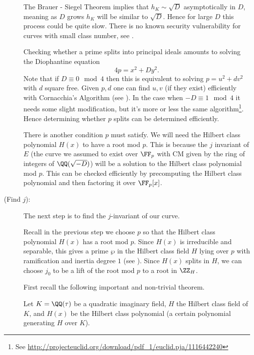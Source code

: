 \documentclass[11pt]{article}
\begin{document}
\begin{description}
	\begin{rem}
		The Brauer - Siegel Theorem implies that $h_K \sim \sqrt{D}$ asymptotically in $D$, meaning as $D$ grows $h_K$ will be similar to $\sqrt{D}$. Hence for large $D$ this process could be quite slow. There is no known security vulnerability for curves with small class number, see \cite[Ch.~4.2.3, Pg.~179]{hankerson2004guide}.
	\end{rem}

	Checking whether a prime splits into principal ideals amounts to solving the Diophantine equation
	$$
	4p = x^2 + Dy^2.
	$$
	Note that if $D\equiv 0\mod{4}$ then this is equivalent to solving $p = u^2 + dv^2$ with $d$ square free. Given $p,d$ one can find $u,v$ (if they exist) efficiently with Cornacchia's Algorithm (see \cite[Alg.~VIII.1]{blake1999elliptic}). In the case when $-D\equiv 1\mod{4}$ it needs some slight modification, but it's more or less the same algorithm\footnote{See \url{http://projecteuclid.org/download/pdf_1/euclid.pja/1116442240}}. Hence determining whether $p$ splits can be determined efficiently.
	
	There is another condition $p$ must satisfy. We will need the Hilbert class polynomial $H(x)$ to have a root mod $p$. This is because the $j$ invariant of $E$ (the curve we assumed to exist over $\FF_p$ with CM given by the ring of integers of $\QQ(\sqrt{-D})$) will be a solution to the Hilbert class polynomial mod $p$. This can be checked efficiently by precomputing the Hilbert class polynomial and then factoring it over $\FF_p[x]$.
	
	\item[(Find $j$):]
	
	The next step is to find the $j$-invariant of our curve.
	
	Recall in the previous step we choose $p$ so that the Hilbert class polynomial $H(x)$ has a root mod $p$. Since $H(x)$ is irreducible and separable, this gives a prime $\wp$ in the Hilbert class field $H$ lying over $p$ with ramification and inertia degree $1$ (see \cite[Prop.~I.8.3]{neukirch2013algebraic}). Since $H(x)$ splits in $H$, we can choose $j_0$ to be a lift of the root mod $p$ to a root in $\ZZ_H$.
	
	First recall the following important and non-trivial theorem.
	\begin{thm}
		Let $K=\QQ(\tau)$ be a quadratic imaginary field, $H$ the Hilbert class field of $K$, and $H(x)$ be the Hilbert class polynomial (a certain polynomial generating $H$ over $K$).
		

\end{thm}
\end{description}
\end{document}
